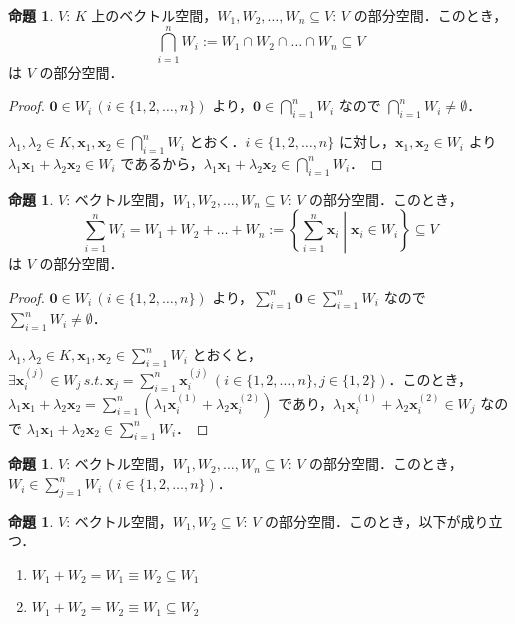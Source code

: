 \documentclass{jlreq}
\theoremstyle{definition}
\newtheorem{prop}[thm]{命題}
\newcommand{\relmiddle}[1]{\mathrel{}\middle#1\mathrel{}}
\begin{document}
      \begin{prop}
        $V$: $K$ 上のベクトル空間，$W_1, W_2, \dots, W_n \subseteq V$: $V$ の部分空間．このとき，$$\bigcap_{i=1}^n W_i := W_1 \cap W_2 \cap \dots \cap W_n \subseteq V$$ は $V$ の部分空間．
      \end{prop}
      \begin{proof}
        $\bm{0} \in W_i \, (i \in \{1,2,\dots,n\})$ より，$\bm{0} \in \bigcap_{i=1}^n W_i$ なので $\bigcap_{i=1}^n W_i \neq \emptyset$．

        $\lambda_1,\lambda_2 \in K, \bm{x}_1,\bm{x}_2 \in \bigcap_{i=1}^n W_i$ とおく．$i \in \{1,2,\dots,n\}$ に対し，$\bm{x}_1,\bm{x}_2 \in W_i$ より $\lambda_1\bm{x}_1+\lambda_2\bm{x}_2 \in W_i$ であるから，$\lambda_1\bm{x}_1+\lambda_2\bm{x}_2 \in \bigcap_{i=1}^n W_i$．
      \end{proof}
      \begin{prop}
        $V$: ベクトル空間，$W_1, W_2, \dots, W_n \subseteq V$: $V$ の部分空間．このとき，$$\sum_{i=1}^n W_i = W_1 + W_2 + \dots + W_n := \left\{\sum_{i=1}^n\bm{x}_i \relmiddle| \bm{x}_i \in W_i\right\} \subseteq V$$ は $V$ の部分空間．
      \end{prop}
      \begin{proof}
        $\bm{0} \in W_i \, (i \in \{1,2,\dots,n\})$ より，$\sum_{i=1}^n\bm{0} \in \sum_{i=1}^n W_i$ なので $\sum_{i=1}^n W_i \neq \emptyset$．

        $\lambda_1,\lambda_2 \in K, \bm{x}_1,\bm{x}_2 \in \sum_{i=1}^n W_i$ とおくと，$\exists \bm{x}_i^{(j)} \in W_j \, s.t.\, \bm{x}_j=\sum_{i=1}^n\bm{x}_i^{(j)} \, (i \in \{1,2,\dots,n\}, j \in \{1,2\})$．このとき，$\lambda_1\bm{x}_1+\lambda_2\bm{x}_2=\sum_{i=1}^n(\lambda_1\bm{x}_i^{(1)}+\lambda_2\bm{x}_i^{(2)})$ であり，$\lambda_1\bm{x}_i^{(1)}+\lambda_2\bm{x}_i^{(2)} \in W_j$ なので $\lambda_1\bm{x}_1+\lambda_2\bm{x}_2 \in \sum_{i=1}^n W_i$．
      \end{proof}
      \begin{prop}
        $V$: ベクトル空間，$W_1, W_2, \dots, W_n \subseteq V$: $V$ の部分空間．このとき，$W_i \in \sum_{j=1}^nW_i \, (i \in \{1,2,\dots,n\})$．
      \end{prop}
      \begin{prop}\label{property-sum-of-subspaces}
        $V$: ベクトル空間，$W_1, W_2 \subseteq V$: $V$ の部分空間．このとき，以下が成り立つ．
        \begin{enumerate}
          \item $W_1 + W_2 = W_1 \equiv W_2 \subseteq W_1$
          \item $W_1 + W_2 = W_2 \equiv W_1 \subseteq W_2$
        \end{enumerate}
      \end{prop}
\end{document}
